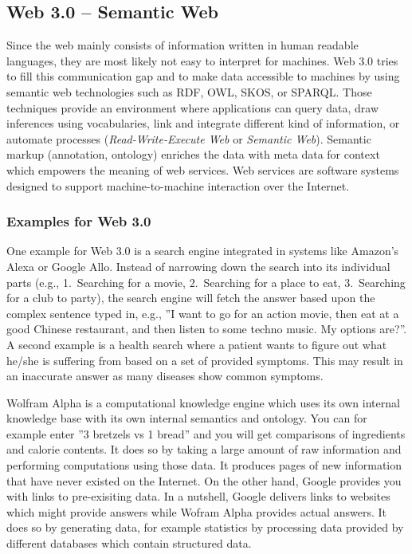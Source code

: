 \documentclass[a4paper]{article}
\begin{document}
\subsection*{Web 3.0 -- Semantic Web}
Since the web mainly consists of information written in human readable languages, they are most likely not easy to interpret for machines.
Web 3.0 tries to fill this communication gap and to make data accessible to machines by using semantic web technologies such as RDF, OWL, SKOS, or SPARQL.
Those techniques provide an environment where applications can query data, draw inferences using vocabularies, link and integrate different kind of information, or automate processes (\emph{Read-Write-Execute Web} or \emph{Semantic Web}).
Semantic markup (annotation, ontology) enriches the data with meta data for context which empowers the meaning of web services.
Web services are software systems designed to support machine-to-machine interaction over the Internet.

\subsubsection*{Examples for Web 3.0}
One example for Web 3.0 is a search engine integrated in systems like Amazon's Alexa or Google Allo.
Instead of narrowing down the search into its individual parts (e.g., 1.~Searching for a movie, 2.~Searching for a place to eat, 3.~Searching for a club to party),
the search engine will fetch the answer based upon the complex sentence typed in, e.g., ''I want to go for an action movie, then eat at a good Chinese restaurant, and then listen to some techno music. My options are?''.
A second example is a health search where a patient wants to figure out what he/she is suffering from based on a set of provided symptoms.
This may result in an inaccurate answer as many diseases show common symptoms.

Wolfram Alpha is a computational knowledge engine which uses its own internal knowledge base with its own internal semantics and ontology.
You can for example enter ''3 bretzels vs 1 bread'' and you will get comparisons of ingredients and calorie contents.
It does so by taking a large amount of raw information and performing computations using those data.
It produces pages of new information that have never existed on the Internet.
On the other hand, Google provides you with links to pre-exisiting data.
In a nutshell, Google delivers links to websites which might provide answers while Wofram Alpha provides actual answers.
It does so by generating data, for example statistics by processing data provided by different databases which contain structured data.
\end{document}
